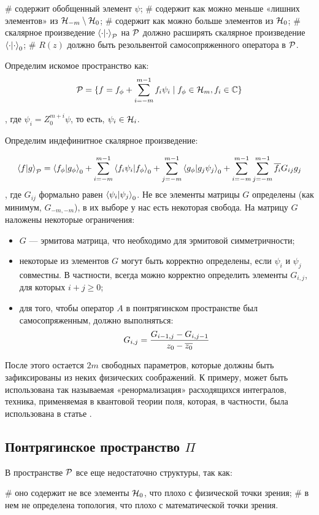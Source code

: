 \begin{elist}
# содержит обобщенный элемент $\psi$;
# содержит как можно меньше «лишних элементов» из  $\mathcal{H}_{-m} \setminus \mathcal{H}_{0}$;
# содержит как можно больше элементов из $\mathcal{H}_{0}$;
# скалярное произведение $\ipcdot_\mcP$ на $\mathcal{P}$ должно расширять скалярное произведение $\ipcdot_0$;
# $R(z)$ должно быть резольвентой самосопряженного оператора в $\mathcal{P}$.
\end{elist}

Определим искомое пространство как:
\[
\mathcal{P} = 
\{ f = f_\phi + \sum\limits_{i = -m}^{m - 1} f_i \psi_i \mid f_\phi \in \mathcal{H}_{m}, f_i \in \mathbb{C}\}
\]

, где $\psi_i = Z_0^{m + i} \psi$, то есть, $\psi_i \in \mathcal{H}_{i}$.

Определим индефинитное скалярное произведение:

\[
\ip{f}{g}_\mcP =
\ip{f_\phi}{g_\phi}_0 +
\sum\limits_{i = -m}^{m - 1} \ip{f_i \psi_i}{f_\phi}_0 +
\sum\limits_{j = -m}^{m - 1} \ip{g_\phi}{g_j \psi_j}_0 +
\sum\limits_{i = -m}^{m - 1} \sum\limits_{j = -m}^{m - 1} \cconj{f_i} G_{ij} g_j
\]
, где $G_{ij}$ формально равен $\ip{\psi_i}{\psi_j}_0$. Не все элементы матрицы $G$ определены (как минимум, $G_{-m, -m}$), в их выборе у нас есть некоторая свобода. На матрицу $G$ наложены некоторые ограничения:

\begin{itemize}
\item $G$ — эрмитова матрица, что необходимо для эрмитовой симметричности;
\item некоторые из элементов $G$ могут быть корректно определены, если $\psi_i$ и $\psi_j$ совместны. В частности, всегда можно корректно определить элементы $G_{i, j}$, для которых $i + j \ge 0$;
\item для того, чтобы оператор $A$ в понтрягинском пространстве был самосопряженным, должно выполняться:
\[
G_{i, j} = \frac{G_{i - 1, j} - G_{i, j - 1}}{z_0 - \overline{z_0}}
\]
\end{itemize}

После этого остается $2 m$ свободных параметров, которые должны быть зафиксированы из неких физических соображений. К примеру, может быть использована так называемая «ренормализация» расходящихся интегралов, техника, применяемая в квантовой теории поля, которая, в частности, была использована в статье \cite{berezin1963models}.

\subsection{Понтрягинское пространство $\Pi$}
В пространстве $\mathcal{P}$ все еще недостаточно структуры, так как:
\begin{ilist}
# оно содержит не все элементы $\mathcal{H}_{0}$, что плохо с физической точки зрения;
# в нем не определена топология, что плохо с математической точки зрения.
\end{ilist}

